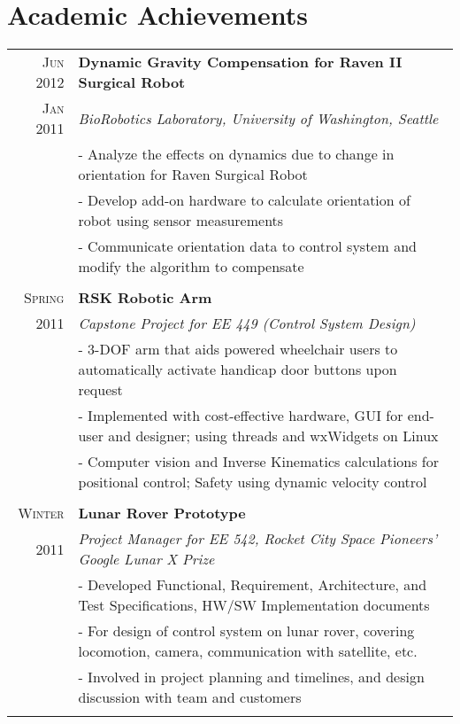 \documentclass[letter,10pt]{article}
\begin{document}
\section{Academic Achievements}
\begin{tabular}{r|p{16cm}}

\textsc{Jun 2012} & \textbf{Dynamic Gravity Compensation for Raven II Surgical Robot}\\
\textsc{Jan 2011}&\emph{BioRobotics Laboratory, University of Washington, Seattle}\\
&\footnotesize{
 - Analyze the effects on dynamics due to change in orientation for Raven Surgical Robot
}\\
&\footnotesize{
 - Develop add-on hardware to calculate orientation of robot using sensor measurements
}\\
&\footnotesize{
 - Communicate orientation data to control system and modify the algorithm to compensate
}\\

\multicolumn{2}{c}{} \\

\textsc{Spring} & \textbf{RSK Robotic Arm}\\
\textsc{2011}&\emph{Capstone Project for EE 449 (Control System Design)}\\
&\footnotesize{
 - 3-DOF arm that aids powered wheelchair users to automatically activate handicap door buttons upon request
}\\
&\footnotesize{
 - Implemented with cost-effective hardware, GUI for end-user and designer; using threads and wxWidgets on Linux
}\\
&\footnotesize{
 - Computer vision and Inverse Kinematics calculations for positional control; Safety using dynamic velocity control
}\\

\multicolumn{2}{c}{} \\

\textsc{Winter} & \textbf{Lunar Rover Prototype}\\
\textsc{2011}&\emph{Project Manager for EE 542, Rocket City Space Pioneers' Google Lunar X Prize}\\
&\footnotesize{
 - Developed Functional, Requirement, Architecture, and Test Specifications, HW/SW Implementation documents
}\\
&\footnotesize{
 - For design of control system on lunar rover, covering locomotion, camera, communication with satellite, etc.
}\\
&\footnotesize{
 - Involved in project planning and timelines, and design discussion with team and customers
}\\
\multicolumn{2}{c}{} \\



\end{tabular}
\end{document}

